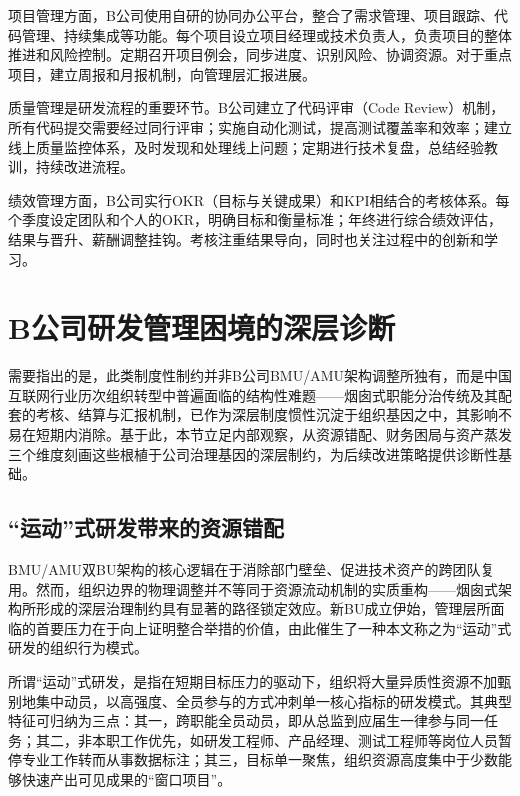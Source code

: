 项目管理方面，B公司使用自研的协同办公平台，整合了需求管理、项目跟踪、代码管理、持续集成等功能。每个项目设立项目经理或技术负责人，负责项目的整体推进和风险控制。定期召开项目例会，同步进度、识别风险、协调资源。对于重点项目，建立周报和月报机制，向管理层汇报进展。

质量管理是研发流程的重要环节。B公司建立了代码评审（Code Review）机制，所有代码提交需要经过同行评审；实施自动化测试，提高测试覆盖率和效率；建立线上质量监控体系，及时发现和处理线上问题；定期进行技术复盘，总结经验教训，持续改进流程。

绩效管理方面，B公司实行OKR（目标与关键成果）和KPI相结合的考核体系\cite{chen2006technology,gao2004technology}。每个季度设定团队和个人的OKR，明确目标和衡量标准；年终进行综合绩效评估，结果与晋升、薪酬调整挂钩\cite{anderson1991predicting}。考核注重结果导向，同时也关注过程中的创新和学习\cite{zhou2020positive}。

\section{B公司研发管理困境的深层诊断}

需要指出的是，此类制度性制约并非B公司BMU/AMU架构调整所独有，而是中国互联网行业历次组织转型中普遍面临的结构性难题——烟囱式职能分治传统及其配套的考核、结算与汇报机制，已作为深层制度惯性沉淀于组织基因之中，其影响不易在短期内消除。基于此，本节立足内部观察，从资源错配、财务困局与资产蒸发三个维度刻画这些根植于公司治理基因的深层制约，为后续改进策略提供诊断性基础。

\subsection{“运动”式研发带来的资源错配}
\label{subsec:campaign-rd}

BMU/AMU双BU架构的核心逻辑在于消除部门壁垒、促进技术资产的跨团队复用。然而，组织边界的物理调整并不等同于资源流动机制的实质重构——烟囱式架构所形成的深层治理制约具有显著的路径锁定效应。新BU成立伊始，管理层所面临的首要压力在于向上证明整合举措的价值，由此催生了一种本文称之为“运动”式研发的组织行为模式。

所谓“运动”式研发，是指在短期目标压力的驱动下，组织将大量异质性资源不加甄别地集中动员，以高强度、全员参与的方式冲刺单一核心指标的研发模式。其典型特征可归纳为三点：其一，跨职能全员动员，即从总监到应届生一律参与同一任务；其二，非本职工作优先，如研发工程师、产品经理、测试工程师等岗位人员暂停专业工作转而从事数据标注；其三，目标单一聚焦，组织资源高度集中于少数能够快速产出可见成果的“窗口项目”。

